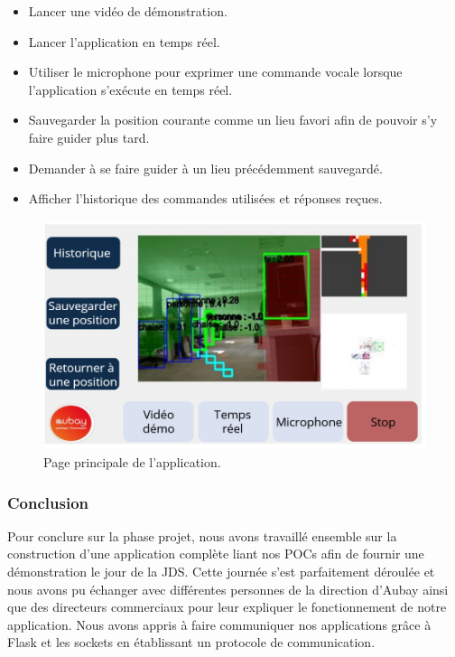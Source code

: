 \documentclass[11pt]{article}
\begin{document}
        \begin{itemize}
          \item Lancer une vidéo de démonstration.
          \item Lancer l'application en temps réel.
          \item Utiliser le microphone pour exprimer une commande vocale lorsque l'application s'exécute en temps réel.
          \item Sauvegarder la position courante comme un lieu favori afin de pouvoir s'y faire guider plus tard.
          \item Demander à se faire guider à un lieu précédemment sauvegardé.
          \item Afficher l'historique des commandes utilisées et réponses reçues.   
        \end{itemize} 

        \begin{figure}[hbt]  
          \includegraphics[width=\textwidth]{Application.png}    
          \caption{Page principale de l'application.}
          \label{fig:Application}
        \end{figure}     

      \subsubsection{Conclusion}
        Pour conclure sur la phase projet, nous avons travaillé ensemble sur la construction d'une application complète liant nos POCs afin de
        fournir une démonstration le jour de la JDS. Cette journée s'est parfaitement déroulée et nous avons pu échanger avec différentes
        personnes de la direction d'Aubay ainsi que des directeurs commerciaux pour leur expliquer le fonctionnement de notre application.
        Nous avons appris à faire communiquer nos applications grâce à Flask et les sockets en établissant un protocole de communication.
\end{document}

